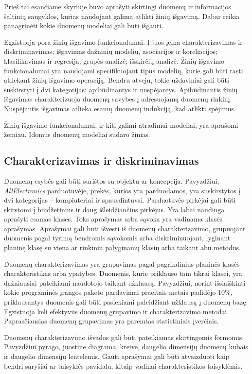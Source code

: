 Prieš tai esančiame skyriuje buvo aprašyti skirtingi duomenų ir informacijos šaltinių saugyklos, kurias naudojant galima atlikti žinių išgavimą.
Dabar reikia panagrinėti kokie duomenų modeliai gali būti išgauti.

Egzistuoja pora žinių išgavimo funkcionalumai. 
Į juos įeina charakterizavimas ir diskriminavimas; išgavimas dažninių modelių, asociacijos ir koreliacijos; klasifikavimas ir regresija; grupės analizė; išskirčių analizė.
Žinių išgavimo funkcionalumai yra naudojami specifikuojant tipus modelių, kurie gali būti rasti atliekant žinių išgavimo operaciją.
Bendru atveju, tokie uždaviniai gali būti suskirstyti į dvi kategorijas: apibūdinantys ir nuspėjantys.
Apibūdinantis žinių išgavimas charakterizuoja duomenų savybes į adresuojamą duomenų rinkinį.
Nuspėjantis išgavimas atlieka esamų duomenų indukciją, kad atlikti spėjimus.

Žinių išgavimo funkcionalumai, ir kiti galimi atradimui modeliai, yra aprašomi žemiau. Įdomūs duomenų modeliai sudaro žinias.

\subsection{Charakterizavimas ir diskriminavimas}

Duomenų esybės gali būti surištos su objektu ar koncepcija.
Pavyzdžiui, \textit{AllElectronics} parduotuvėje, prekės, kurios yra parduodamos, yra suskirstytos į dvi kategorijas -- kompiuteriai ir spausdintuvai. Parduotuvės pirkėjai gali būti skirstomi į biudžetinius ir daug išleidžiančius pirkėjus.
Yra labai naudinga aprašyti esamas klases.
Toks aprašymas arba sąvoka yra vadinama klasės aprašymas.
Aprašymai gali būti išvesti iš duomenų charakterizavimo, grupuojant duomenis pagal tyrimą bendromis sąvokomis arba diskriminuojant, lyginant planinę klasę su viena ar rinkiniu palyginamų klasių arba taikant abu metodus.

Duomenų charakterizavimas yra grupavimas pagal pagrindinius planinės klasės charakteristikas arba ypatybes. 
Duomenis, kurie priklauso tam tikrai klasei, yra dažniausiai pateikiami naudotojo taikant užklausą.
Pavyzdžiui, norint išsiaiškinti kokie programinės įrangos paketo pardavimai praeitais metais padidėjo 10\%, priklausantys duomenis gali būti pasiekiami paleidžiant užklausą į duomenų bazę.
Egzistuoja keli efektyvūs duomenų grupavimo ir charakterizavimo metodai.
Paprasčiausias duomenų grupavimas yra paremtas statistiniais įverčiais.

Duomenų charakterizavimo išvados gali būti pateikiamas skirtingomis formomis.
Pavyzdžiui pyrago, juostine diagrama, kreive, daugelio dimensijų duomenų kubais ir daugelio dimensijų lentelėmis.
Gauti aprašymai gali būti atvaizduoti kaip bendri sąryšiai ar taisyklės pavidalu, kitaip vadinai charakteristikos taisyklėmis.

